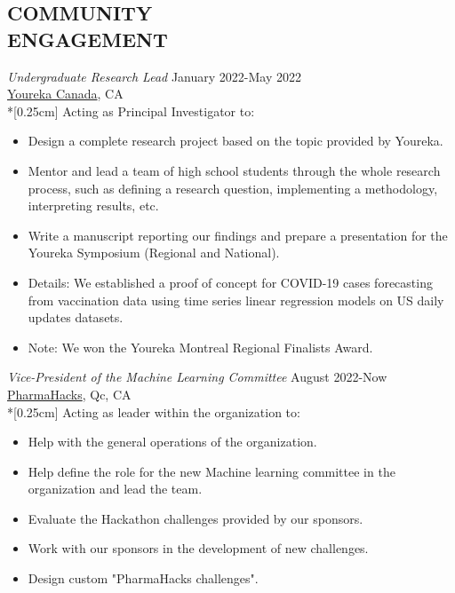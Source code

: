 \documentclass[margin, 10pt]{res} %
\begin{document}
\begin{resume}
		\section{COMMUNITY \\ ENGAGEMENT}
		{\sl Undergraduate Research Lead} \hfill January 2022-May 2022\\ \href{https://yourekacanada.org/}{Youreka Canada}, CA\\*[0.25cm] 
		Acting as Principal Investigator to:
		\vspace*{0.15cm}
		\begin{itemize}\itemsep -2pt %
			\item Design a complete research project based on the topic provided by Youreka.
			\item Mentor and lead a team of high school students through the whole research process, such as defining a research question, implementing a methodology, interpreting results, etc.
			\item Write a manuscript reporting our findings and prepare a presentation for the Youreka Symposium (Regional and National).
			\item[\ding{71}] Details: We established a proof of concept for COVID-19 cases forecasting from vaccination data using time series linear regression models on US daily updates datasets.
			\item[\ding{72}] Note: We won the Youreka Montreal Regional Finalists Award.
		\end{itemize}
		
		{\sl Vice-President of the Machine Learning Committee} \hfill August 2022-Now\\ \href{https://pharmahacks.com/}{PharmaHacks}, Qc, CA\\*[0.25cm] 
		Acting as leader within the organization to:
		\vspace*{0.15cm}
		\begin{itemize}\itemsep -2pt %
			\item Help with the general operations of the organization.
			\item Help define the role for the new Machine learning committee in the organization and lead the team.
			\item Evaluate the Hackathon challenges provided by our sponsors.
			\item Work with our sponsors in the development of new challenges.
			\item Design custom "PharmaHacks challenges".  
		\end{itemize}
		

\end{resume}
\end{document}
